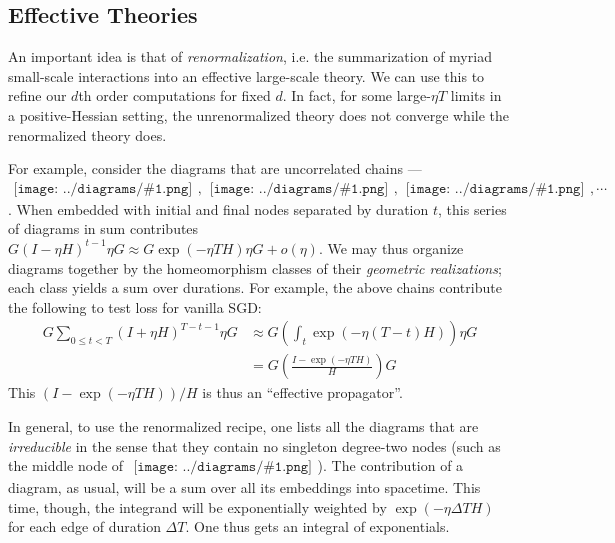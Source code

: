 \documentclass{article}
\newcommand{\wrap}[1]{\left(#1\right)}
\newcommand{\sdia}[1]{\begin{gathered}\texttt{[image: ../diagrams/\#1.png]}\end{gathered}}
\begin{document}

    \subsection{Effective Theories} \label{subsect:effective}
        An important idea is that of \emph{renormalization}, i.e. the
        summarization of myriad small-scale interactions into an effective
        large-scale theory.  We can use this to refine our $d$th order
        computations for fixed $d$.  In fact, for some large-$\eta T$ limits
        in a positive-Hessian setting, the unrenormalized theory does not
        converge while the renormalized theory does.

        For example, consider the diagrams that are uncorrelated chains ---
        $\sdia{(0-1)(01)}, \sdia{(0-1-2)(01-12)},
        \sdia{(0-1-2-3)(01-12-23)}, \cdots$.  When embedded with initial and
        final nodes separated by duration $t$, this series of diagrams in sum
        contributes
        $
            G (I-\eta H)^{t-1} \eta G
            \approx
            G \exp(-\eta T H) \eta G
            +
            o(\eta)
        $.
        We may thus organize diagrams together by the homeomorphism classes of
        their \emph{geometric realizations}; each class yields a sum over
        durations.  For example, the above chains contribute the following to
        test loss for vanilla SGD:
        \begin{align*}
            G \sum_{0\leq t<T} (I+\eta H)^{T-t-1} \eta G
            &\approx
            G \wrap{\int_t \exp(-\eta (T-t) H)} \eta G\\
            &=
            G \wrap{\frac{I - \exp(-\eta T H)}{H}} G
        \end{align*}
        This 
        $
            \wrap{I - \exp(-\eta T H)}/H
        $
        is thus an ``effective propagator''.

        In general, to use the renormalized recipe, one lists all the diagrams
        that are \emph{irreducible} in the sense that they contain no singleton
        degree-two nodes (such as the middle node of $\sdia{(0-1-2)(01-12)}$).
        The contribution of a diagram, as usual, will be a sum over all its
        embeddings into spacetime.  This time, though, the integrand will be
        exponentially weighted by $\exp(-\eta \Delta T H)$ for each edge of
        duration $\Delta T$.  One thus gets an integral of exponentials.
\end{document}
